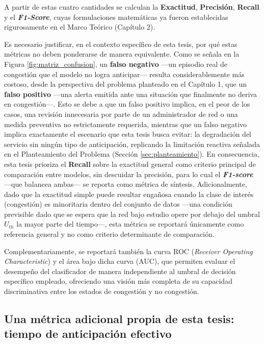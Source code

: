 \documentclass[12pt]{report}
\begin{document}
A partir de estas cuatro cantidades se calculan la \textbf{Exactitud}, \textbf{Precisión}, \textbf{Recall} y el \textbf{\textit{F1-Score}}, cuyas formulaciones matemáticas ya fueron establecidas rigurosamente en el Marco Teórico (Capítulo 2).

Es necesario justificar, en el contexto específico de esta tesis, por qué estas métricas no deben ponderarse de manera equivalente. Como se señala en la Figura \ref{fig:matriz_confusion}, un \textbf{falso negativo} ---un episodio real de congestión que el modelo no logra anticipar--- resulta considerablemente más costoso, desde la perspectiva del problema planteado en el Capítulo 1, que un \textbf{falso positivo} ---una alerta emitida ante una situación que finalmente no deriva en congestión---. Esto se debe a que un falso positivo implica, 
en el peor de los casos, una revisión innecesaria por parte de un administrador de red o una medida preventiva no estrictamente requerida, mientras que un falso negativo implica exactamente el escenario que esta tesis busca evitar: la degradación del servicio sin ningún tipo de anticipación, replicando la limitación reactiva señalada en el Planteamiento del Problema (Sección \ref{sec:planteamiento}). En consecuencia, esta tesis prioriza el \textbf{Recall} sobre la exactitud general como criterio principal de comparación 
entre modelos, sin descuidar la precisión, para lo cual el \textbf{\textit{F1-score}} ---que balancea ambas--- se reporta como métrica de síntesis. Adicionalmente, dado que la exactitud simple puede resultar engañosa cuando la clase de interés (congestión) es minoritaria dentro del conjunto de datos ---una condición previsible dado que se espera que la red bajo estudio opere por debajo del umbral $U_{th}$ la mayor parte del tiempo---, esta métrica se reportará únicamente como referencia general y no como criterio determinante de comparación.

Complementariamente, se reportará también la curva ROC (\textit{Receiver Operating Characteristic}) y el área bajo dicha curva (AUC), que permiten evaluar el desempeño del clasificador de manera independiente al umbral de decisión específico empleado, ofreciendo una visión más completa de su capacidad discriminativa entre los estados de congestión y no congestión.

\subsection*{Una métrica adicional propia de esta tesis: tiempo de anticipación efectivo}
\end{document}
